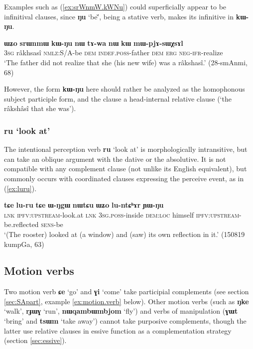\documentclass[oneside,a4paper,11pt]{article}
\newcommand{\ipa}[1]{\textbf{\phon#1}} %
\newcommand{\jpg}[2]{\ipa{#1} `#2'} %
\newcommand{\refb}[1]{(\ref{#1})}
\begin{document}
Examples such as \refb{ex:srWnmW.kWNu} could superficially appear to be infinitival clauses, since \jpg{ŋu}{be}̌, being a stative verb, makes its infinitive in \ipa{kɯ-ŋu}.

\begin{exe}
\ex \label{ex:srWnmW.kWNu}
 \gll \ipa{ɯʑo} 	\ipa{srɯnmɯ} 	\ipa{kɯ-ŋu} 	\ipa{nɯ} 	\ipa{tɤ-wa} 	\ipa{nɯ} 	\ipa{kɯ} 	\ipa{mɯ-pjɤ-sɯχsɤl} 	\\
 \textsc{3sg} râkhsasî \textsc{nmlz}:S/A-be \textsc{dem} \textsc{indef.poss}-father \textsc{dem} \textsc{erg} \textsc{neg-ifr}-realize \\
 \glt `The father did not realize that she (his new wife) was a râkshasî.' (28-smAnmi, 68)
\end{exe}

However, the form  \ipa{kɯ-ŋu} here should rather be analyzed as the homophonous subject participle form, and the clause a head-internal relative clause (`the râkshâsî that she was'). 

\subsubsection{\jpg{ru}{look at}}
The intentional perception verb \jpg{ru}{look at} is morphologically intransitive, but can take an oblique argument with the dative or the absolutive. It is not compatible with any complement clause (not unlike its English equivalent), but commonly occurs with coordinated clauses expressing the perceive event, as in \refb{ex:luru}.

\begin{exe}
\ex \label{ex:luru}
 \gll \ipa{tɕe} 	\ipa{lu-ru} 	\ipa{tɕe} 	\ipa{ɯ-ŋgɯ} 	\ipa{nɯtɕu} 	\ipa{ɯʑo} 	\ipa{lu-ntɕʰɤr} 	\ipa{ɲɯ-ŋu} \\
 \textsc{lnk} \textsc{ipfv:upstream}-look.at  \textsc{lnk}  \textsc{3sg.poss}-inside \textsc{dem:loc} himself \textsc{ipfv:upstream}-be.reflected \textsc{sens}-be \\
 \glt `(The rooster) looked at (a window) and (saw) its own reflection in it.' (150819 kumpGa, 63)
\end{exe}
  
  \subsection{Motion verbs}
Two motion verb \jpg{ɕe}{go} and \jpg{ɣi}{come} take participial complements (see section \ref{sec:SApart}, example \ref{ex:motion.verb} below). Other motion verbs (such as \jpg{ŋke}{walk}, \jpg{rɟɯɣ}{run}, \jpg{nɯqambɯmbjom}{fly})  and verbs of manipulation (\jpg{ɣɯt}{bring} and \jpg{tsɯm}{take away}) cannot take purposive complements, though the latter use relative clauses in essive function as a complementation strategy (section \ref{sec:essive}).
 
\end{document}
